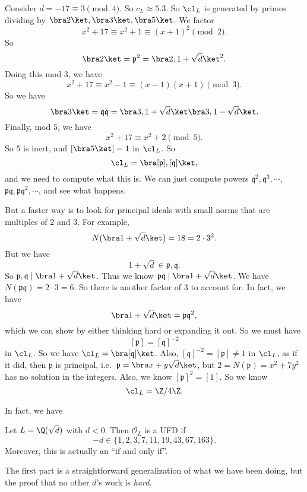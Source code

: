 \documentclass[a4paper]{article}
\begin{document}
\begin{eg}
  Consider $d = -17 \equiv 3 \pmod 4$. So $c_L \approx 5.3$. So $\cl_L$ is generated by primes dividing by $\bra 2\ket, \bra 3\ket, \bra 5\ket$. We factor
  \[
    x^2 + 17 \equiv x^2 + 1 \equiv (x + 1)^2 \pmod 2.
  \]
  So
  \[
    \bra 2\ket = \mathfrak{p}^2 = \bra 2, 1 + \sqrt{d}\ket^2.
  \]
  Doing this mod $3$, we have
  \[
    x^2 + 17 \equiv x^2 - 1 \equiv (x - 1)(x + 1) \pmod 3.
  \]
  So we have
  \[
    \bra 3\ket = \mathfrak{q}\bar{\mathfrak{q}} = \bra 3, 1 + \sqrt{d}\ket \bra 3, 1 - \sqrt{d}\ket.
  \]
  Finally, mod $5$, we have
  \[
    x^2 + 17 \equiv x^2 + 2 \pmod 5.
  \]
  So $5$ is inert, and $[\bra 5\ket] = 1$ in $\cl_L$. So
  \[
    \cl_L = \bra [\mathfrak{p}], [\mathfrak{q}]\ket,
  \]
  and we need to compute what this is. We can just compute powers $\mathfrak{q}^2, \mathfrak{q}^3, \cdots$, $\mathfrak{p}\mathfrak{q}, \mathfrak{p}\mathfrak{q}^2, \cdots$, and see what happens.

  But a faster way is to look for principal ideals with small norms that are multiples of $2$ and $3$. For example,
  \[
    N(\bra 1 + \sqrt{d}\ket) = 18 = 2 \cdot 3^2.
  \]
  But we have
  \[
    1 + \sqrt{d} \in \mathfrak{p}, \mathfrak{q}.
  \]
  So $\mathfrak{p}, \mathfrak{q} \mid \bra 1 + \sqrt{d}\ket$. Thus we know $\mathfrak{p}\mathfrak{q} \mid \bra 1 + \sqrt{d}\ket$. We have $N(\mathfrak{p}\mathfrak{q}) = 2 \cdot 3 = 6$. So there is another factor of $3$ to account for. In fact, we have
  \[
    \bra 1 + \sqrt{d}\ket = \mathfrak{p}\mathfrak{q}^2,
  \]
  which we can show by either thinking hard or expanding it out. So we must have
  \[
    [\mathfrak{p}] = [\mathfrak{q}]^{-2}
  \]
  in $\cl_L$. So we have $\cl_L = \bra [\mathfrak{q}]\ket$. Also, $[\mathfrak{q}]^{-2} = [\mathfrak{p}] \not= 1$ in $\cl_L$, as if it did, then $\mathfrak{p}$ is principal, i.e.\ $\mathfrak{p} = \bra x + y\sqrt{d}\ket$, but $2 = N(\mathfrak{p}) = x^2 + 7y^2$ has no solution in the integers. Also, we know $[\mathfrak{p}]^2 = [1]$. So we know
  \[
    \cl_L = \Z/4\Z.
  \]
\end{eg}

In fact, we have
\begin{thm}
  Let $L = \Q(\sqrt{d})$ with $d < 0$. Then $\mathcal{O}_L$ is a UFD if
  \[
    -d \in \{1, 2, 3, 7, 11, 19, 43, 67, 163\}.
  \]
  Moreover, this is actually an ``if and only if''.
\end{thm}
The first part is a straightforward generalization of what we have been doing, but the proof that no other $d$'s work is \emph{hard}.
\end{document}
